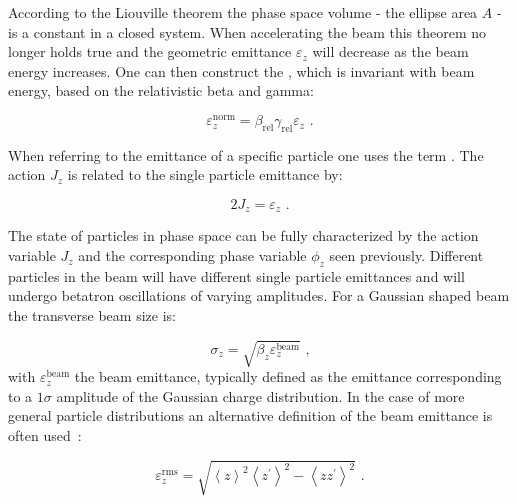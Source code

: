 According to the Liouville theorem the phase space volume - the ellipse area \(A\) - is a constant in a closed system.
When accelerating the beam this theorem no longer holds true and the geometric emittance \(\varepsilon_z\) will decrease as the beam energy increases.
One can then construct the , which is invariant with beam energy, based on the relativistic beta and gamma:

\begin{equation}
    \varepsilon_z^{\mathrm{norm}} = \beta_{\mathrm{rel}} \gamma_{\mathrm{rel}} \varepsilon_z \text{ .}
    \label{equation:normalized_emittance}
\end{equation}

When referring to the emittance of a specific particle one uses the term .
The \gls{action} \(J_z\) is related to the single particle emittance by:

\begin{equation}
    2 J_z = \varepsilon_z \text{ .}
    \label{equation:single_particle_action}
\end{equation}

The state of particles in phase space can be fully characterized by the action variable \(J_z\) and the corresponding phase variable \(\phi_z\) seen previously. 
Different particles in the beam will have different single particle emittances and will undergo betatron oscillations of varying amplitudes.
For a Gaussian shaped beam the transverse beam size is:

\begin{equation}
    \sigma_z = \sqrt{\beta_z \varepsilon_z^{\mathrm{beam}}} \text{ ,}
    \label{equation:gaussian_beam_transverse_beam_size}
\end{equation}
with \(\varepsilon_z^{\mathrm{beam}}\) the beam emittance, typically defined as the emittance corresponding to a \(1 \sigma\) amplitude of the Gaussian charge distribution.
In the case of more general particle distributions an alternative definition of the beam emittance is often used~\cite{CERN:Muller:Beam_Matter_Covariance_Matrix_Emittance, CERN:Buon:CAS_Beam_Phase_Space_Emittance}:

\begin{equation}
    \varepsilon_z^{\mathrm{rms}} = \sqrt{\left\langle z \right\rangle^{2} \left\langle z^{\prime} \right\rangle^{2} - \left\langle zz^{\prime} \right\rangle^{2}} \text{ .}
    \label{equation:beam_emittance_general}
\end{equation}

